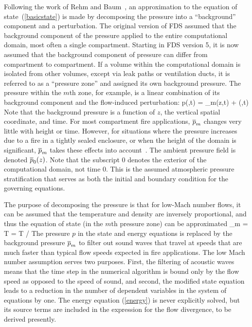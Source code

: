 \documentclass[11pt]{book}
\begin{document}
Following the work of Rehm and Baum~\cite{Rehm:1}, an approximation to the equation of state~(\ref{basicstate}) is made by decomposing the pressure
into a ``background'' component and a perturbation. The original version of FDS assumed that the background component of the pressure
applied to the entire computational domain, most often a single compartment. Starting in FDS version 5, it is now assumed that
the background component of pressure can differ from compartment to compartment. If
a volume within the computational domain is isolated from other volumes, except via leak paths or ventilation ducts, it is referred to as a ``pressure
zone'' and assigned its own background pressure. The pressure within the $m$th zone, for example, is a linear combination
of its background component and the flow-induced perturbation:
\be p(\bx,t) = \bp_m(z,t) + \tp(\bx,t) \ee
Note that the background pressure is a function of $z$, the vertical spatial coordinate, and time. For most
compartment fire applications, $\overline{p}_m$ changes very little with height or time. However, for situations where the pressure
increases due to a fire in a tightly sealed enclosure, or when the height of the domain is significant, $\overline{p}_m$ takes these effects into
account~\cite{Baum:5}. The ambient pressure field is denoted $\overline{p}_0(z)$. Note that the subscript 0 denotes the exterior of the computational domain, not
time 0. This is the assumed atmospheric pressure stratification that serves as both
the initial and boundary condition for the governing equations.

The purpose of decomposing the pressure is that for low-Mach number flows, it can be assumed that the temperature and density are inversely
proportional, and thus the equation of state (in the $m$th pressure zone) can be approximated
\be \bp_m  =  \rho T \R \sumyw = \rho T \R / \bW  \label{state} \ee
The pressure $p$ in the state and energy equations is replaced by the background pressure $\overline{p}_m$ to filter out sound waves
that travel at speeds that are much faster
than typical flow speeds expected in fire applications. The low Mach number assumption serves two purposes. First, the filtering of acoustic waves
means that the time step in the numerical algorithm is bound only by the flow speed as opposed to the speed of sound, and second, the modified state
equation leads to a reduction in the number of dependent variables in the system of equations by one. The energy equation (\ref{energy}) is never
explicitly solved, but its source terms are included in the expression for the flow divergence, to be derived presently.
\end{document}
